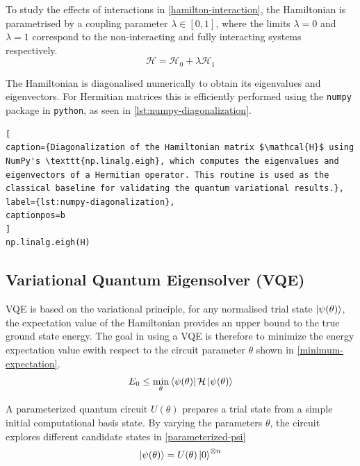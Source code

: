 To study the effects of interactions in \cref{hamilton-interaction}, the Hamiltonian is parametrised by a coupling parameter $\lambda\in[0,1]$, where the limits $\lambda=0$ and $\lambda=1$ correspond to the non-interacting and fully interacting systems respectively.
\begin{equation}\label{hamilton-interaction}
    \mathcal{H}=\mathcal{H}_0+\lambda \mathcal{H}_1
\end{equation}

The Hamiltonian is diagonalised numerically to obtain its eigenvalues and eigenvectors. For Hermitian matrices this is efficiently performed using the \texttt{numpy} package in \texttt{python}, as seen in \cref{lst:numpy-diagonalization}.\newline

\begin{lstlisting}[
caption={Diagonalization of the Hamiltonian matrix $\mathcal{H}$ using NumPy's \texttt{np.linalg.eigh}, which computes the eigenvalues and eigenvectors of a Hermitian operator. This routine is used as the classical baseline for validating the quantum variational results.},
label={lst:numpy-diagonalization},
captionpos=b
]
np.linalg.eigh(H)
\end{lstlisting}

\subsection{Variational Quantum Eigensolver (VQE)}

VQE is based on the variational principle, for any normalised trial state $\left| \psi(\theta) \right\rangle$, the expectation value of the Hamiltonian provides an upper bound to the true ground state energy. The goal in using a VQE is therefore to minimize the energy expectation value ewith respect to the circuit parameter $\theta$ shown in \cref{minimum-expectation}. 
\begin{equation}\label{minimum-expectation}
    E_0\leq\min_\theta\left\langle \psi(\theta) \right|\mathcal{H}\left| \psi(\theta) \right\rangle
\end{equation}

A parameterized quantum circuit $U(\theta)$ prepares a trial state from a simple initial computational basis state. By varying the parameters $\theta$, the circuit explores different candidate states in \cref{parameterized-psi}
\begin{equation}\label{parameterized-psi}
    \left| \psi(\theta) \right\rangle=U(\theta)\left| 0 \right\rangle^{\otimes n}
\end{equation}

